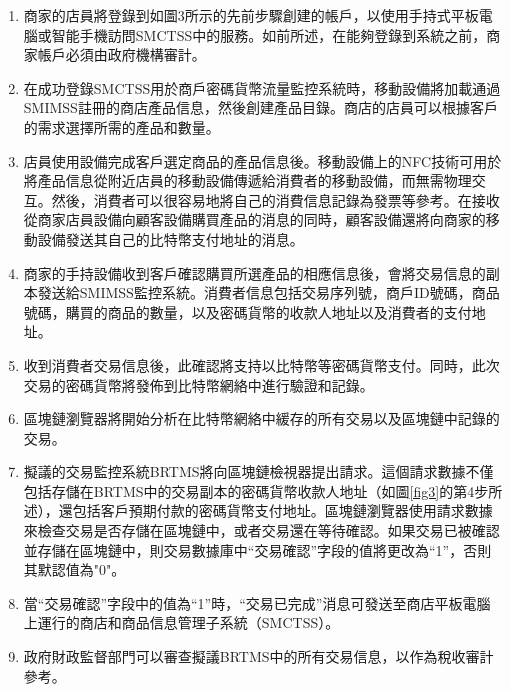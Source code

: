 		\begin{enumerate}
			\item 商家的店員將登錄到如圖3所示的先前步驟創建的帳戶，以使用手持式平板電腦或智能手機訪問SMCTSS中的服務。如前所述，在能夠登錄到系統之前，商家帳戶必須由政府機構審計。
			\item 在成功登錄SMCTSS用於商戶密碼貨幣流量監控系統時，移動設備將加載通過SMIMSS註冊的商店產品信息，然後創建產品目錄。商店的店員可以根據客戶的需求選擇所需的產品和數量。
			\item 店員使用設備完成客戶選定商品的產品信息後。移動設備上的NFC技術可用於將產品信息從附近店員的移動設備傳遞給消費者的移動設備，而無需物理交互。然後，消費者可以很容易地將自己的消費信息記錄為發票等參考。在接收從商家店員設備向顧客設備購買產品的消息的同時，顧客設備還將向商家的移動設備發送其自己的比特幣支付地址的消息。
			\item 商家的手持設備收到客戶確認購買所選產品的相應信息後，會將交易信息的副本發送給SMIMSS監控系統。消費者信息包括交易序列號，商戶ID號碼，商品號碼，購買的商品的數量，以及密碼貨幣的收款人地址以及消費者的支付地址。
			\item 收到消費者交易信息後，此確認將支持以比特幣等密碼貨幣支付。同時，此次交易的密碼貨幣將發佈到比特幣網絡中進行驗證和記錄。
			\item 區塊鏈瀏覽器將開始分析在比特幣網絡中緩存的所有交易以及區塊鏈中記錄的交易。
			\item 擬議的交易監控系統BRTMS將向區塊鏈檢視器提出請求。這個請求數據不僅包括存儲在BRTMS中的交易副本的密碼貨幣收款人地址（如圖\ref{fig3}的第4步所述），還包括客戶預期付款的密碼貨幣支付地址。區塊鏈瀏覽器使用請求數據來檢查交易是否存儲在區塊鏈中，或者交易還在等待確認。如果交易已被確認並存儲在區塊鏈中，則交易數據庫中“交易確認”字段的值將更改為“1”，否則其默認值為"0"。
			\item 當“交易確認”字段中的值為“1”時，“交易已完成”消息可發送至商店平板電腦上運行的商店和商品信息管理子系統（SMCTSS）。
			\item 政府財政監督部門可以審查擬議BRTMS中的所有交易信息，以作為稅收審計參考。
		\end{enumerate}

	
